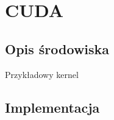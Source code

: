 \chapter{CUDA}
\label{cha:cuda}

\section{Opis środowiska}
\label{sec:opis_cuda}

Przykładowy kernel



\section{Implementacja}
\label{sec:implementacja}